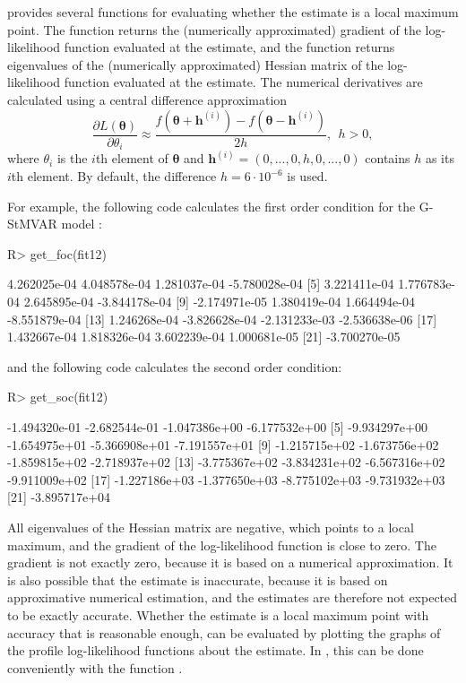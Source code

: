 \documentclass[nojss]{jss}
\begin{document}
 provides several functions for evaluating whether the estimate is a local maximum point. The function  returns the (numerically approximated) gradient of the log-likelihood function evaluated at the estimate, and the function  returns eigenvalues of the (numerically approximated) Hessian matrix of the log-likelihood function evaluated at the estimate. The numerical derivatives are calculated using a central difference approximation
\begin{equation}
\frac{\partial L(\boldsymbol{\theta})}{\partial \theta_i} \approx \frac{f(\boldsymbol{\theta} + \boldsymbol{h}^{(i)}) - f(\boldsymbol{\theta} - \boldsymbol{h}^{(i)})}{2h}, \ \ h>0,
\end{equation}
where $\theta_i$ is the $i$th element of $\boldsymbol{\theta}$ and $\boldsymbol{h}^{(i)}=(0,...,0,h,0,...,0)$
contains $h$ as its $i$th element. By default, the difference $h=6\cdot 10^{-6}$ is used.

For example, the following code calculates the first order condition for the G-StMVAR model :
%
\begin{CodeChunk}
\begin{CodeInput}
R> get_foc(fit12)
\end{CodeInput}
\begin{CodeOutput}
 [1]  4.262025e-04  4.048578e-04  1.281037e-04 -5.780028e-04
 [5]  3.221411e-04  1.776783e-04  2.645895e-04 -3.844178e-04
 [9] -2.174971e-05  1.380419e-04  1.664494e-04 -8.551879e-04
[13]  1.246268e-04 -3.826628e-04 -2.131233e-03 -2.536638e-06
[17]  1.432667e-04  1.818326e-04  3.602239e-04  1.000681e-05
[21] -3.700270e-05
\end{CodeOutput}
\end{CodeChunk}
%
and the following code calculates the second order condition:
%
\begin{CodeChunk}
\begin{CodeInput}
R> get_soc(fit12)
\end{CodeInput}
\begin{CodeOutput}
 [1] -1.494320e-01 -2.682544e-01 -1.047386e+00 -6.177532e+00
 [5] -9.934297e+00 -1.654975e+01 -5.366908e+01 -7.191557e+01
 [9] -1.215715e+02 -1.673756e+02 -1.859815e+02 -2.718937e+02
[13] -3.775367e+02 -3.834231e+02 -6.567316e+02 -9.911009e+02
[17] -1.227186e+03 -1.377650e+03 -8.775102e+03 -9.731932e+03
[21] -3.895717e+04
\end{CodeOutput}
\end{CodeChunk}
%
All eigenvalues of the Hessian matrix are negative, which points to a local maximum, and the gradient of the log-likelihood function is close to zero. The gradient is not exactly zero, because it is based on a numerical approximation. It is also possible that the estimate is inaccurate, because it is based on approximative numerical estimation, and the estimates are therefore not expected to be exactly accurate. Whether the estimate is a local maximum point with accuracy that is reasonable enough, can be evaluated by plotting the graphs of the profile log-likelihood functions about the estimate. In , this can be done conveniently with the function .
\end{document}
